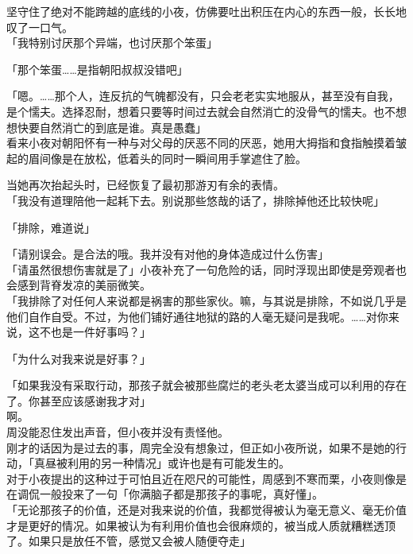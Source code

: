 坚守住了绝对不能跨越的底线的小夜，仿佛要吐出积压在内心的东西一般，长长地叹了一口气。\\

「我特别讨厌那个异端，也讨厌那个笨蛋」

「那个笨蛋……是指朝阳叔叔没错吧」

「嗯。……那个人，连反抗的气魄都没有，只会老老实实地服从，甚至没有自我，是个懦夫。选择忍耐，想着只要等时间过去就会自然消亡的没骨气的懦夫。也不想想快要自然消亡的到底是谁。真是愚蠢」\\

看来小夜对朝阳怀有一种与对父母的厌恶不同的厌恶，她用大拇指和食指触摸着皱起的眉间像是在放松，低着头的同时一瞬间用手掌遮住了脸。

当她再次抬起头时，已经恢复了最初那游刃有余的表情。\\

「我没有道理陪他一起耗下去。别说那些悠哉的话了，排除掉他还比较快呢」

「排除，难道说」

「请别误会。是合法的哦。我并没有对他的身体造成过什么伤害」\\

「请虽然很想伤害就是了」小夜补充了一句危险的话，同时浮现出即使是旁观者也会感到背脊发凉的美丽微笑。\\

「我排除了对任何人来说都是祸害的那些家伙。嘛，与其说是排除，不如说几乎是他们自作自受。不过，为他们铺好通往地狱的路的人毫无疑问是我呢。……对你来说，这不也是一件好事吗？」

「为什么对我来说是好事？」

「如果我没有采取行动，那孩子就会被那些腐烂的老头老太婆当成可以利用的存在了。你甚至应该感谢我才对」\\

啊。\\

周没能忍住发出声音，但小夜并没有责怪他。\\

刚才的话因为是过去的事，周完全没有想象过，但正如小夜所说，如果不是她的行动，「真昼被利用的另一种情况」或许也是有可能发生的。\\

对于小夜提出的这种过于可怕且近在咫尺的可能性，周感到不寒而栗，小夜则像是在调侃一般投来了一句「你满脑子都是那孩子的事呢，真好懂」。\\

「无论那孩子的价值，还是对我来说的价值，我都觉得被认为毫无意义、毫无价值才是更好的情况。如果被认为有利用价值也会很麻烦的，被当成人质就糟糕透顶了。如果只是放任不管，感觉又会被人随便夺走」

